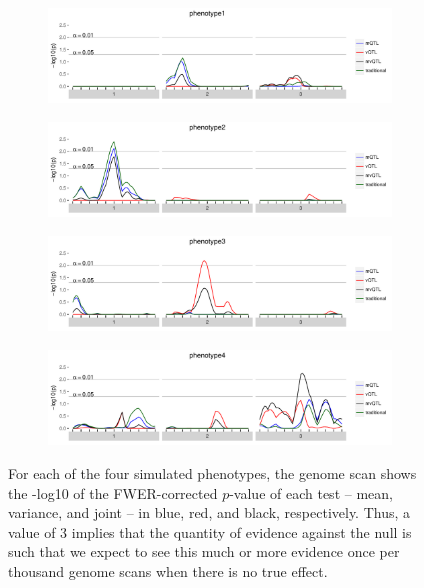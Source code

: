 \documentclass{article}
\begin{document}
\begin{figure}[t]
    \begin{subfigure}[b]{0.9\textwidth}
        \includegraphics[width=\textwidth]{images/empir_p_scan_phenotype1.pdf}
    \end{subfigure}

    \begin{subfigure}[b]{0.9\textwidth}
        \includegraphics[width=\textwidth]{images/empir_p_scan_phenotype2.pdf}
    \end{subfigure}

    \begin{subfigure}[b]{0.9\textwidth}
        \includegraphics[width=\textwidth]{images/empir_p_scan_phenotype3.pdf}
    \end{subfigure}

    \begin{subfigure}[b]{0.9\textwidth}
        \includegraphics[width=\textwidth]{images/empir_p_scan_phenotype4.pdf}
    \end{subfigure}

    \caption{For each of the four simulated phenotypes, the genome scan shows the -log10 of the FWER-corrected $p$-value of each test -- mean, variance, and joint -- in blue, red, and black, respectively. Thus, a value of 3 implies that the quantity of evidence against the null is such that we expect to see this much or more evidence once per thousand genome scans when there is no true effect. \label{fig:empir_p_scans}}
\end{figure}
\end{document}
